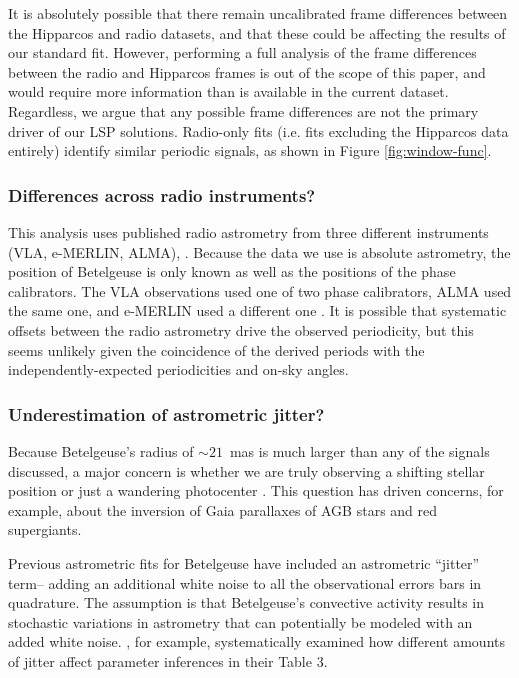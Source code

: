 \documentclass[twocolumn]{aastex631}
\begin{document}
It is absolutely possible that there remain uncalibrated frame differences between the Hipparcos and radio datasets, and that these could be affecting the results of our standard fit. However, performing a full analysis of the frame differences between the radio and Hipparcos frames is out of the scope of this paper, and would require more information than is available in the current dataset. Regardless, we argue that any possible frame differences are not the primary driver of our LSP solutions. Radio-only fits (i.e. fits excluding the Hipparcos data entirely) identify similar periodic signals, as shown in Figure \ref{fig:window-func}. 


\subsubsection{Differences across radio instruments?}

This analysis uses  published radio astrometry from three different instruments (VLA, e-MERLIN, ALMA), \citep[as summarized by][]{2017AJ....154...11H}. Because the data we use is absolute astrometry, the position of Betelgeuse is only known as well as the positions of the phase calibrators. The VLA observations  used one of two phase calibrators, ALMA used the same one, and e-MERLIN used a different one \citep{Harper:2008a,2017AJ....154...11H}. It is possible that systematic offsets between the radio astrometry drive the observed periodicity, but this seems unlikely given the coincidence of the derived periods with the independently-expected periodicities and on-sky angles. %


\subsubsection{Underestimation of astrometric jitter?}
\label{sec:ast-jitter}

Because Betelgeuse's radius of $\sim 21$~mas is much larger than any of the signals discussed, a major concern is whether we are truly observing a shifting stellar position or just a wandering photocenter \citep[e.g.][]{2011A&A...528A.120C,2019MNRAS.487.4832C,2020A&A...640A..23C,2022A&A...661L...1C,2023MNRAS.523.2369S}. This question has driven concerns, for example, about the inversion of Gaia parallaxes of AGB stars and red supergiants. 

Previous astrometric fits for Betelgeuse have included an astrometric ``jitter'' term-- adding an additional white noise to all the observational errors bars in quadrature. The assumption is that Betelgeuse's convective activity results in stochastic variations in astrometry that can potentially be modeled with an added white noise. \citet{2017AJ....154...11H}, for example, systematically examined how different amounts of jitter affect parameter inferences in their Table 3. 
\end{document}
